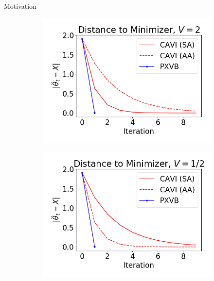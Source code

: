 \documentclass[final]{beamer}
\newlength{\onecolwid}
\begin{document}
\begin{frame}[t]
\begin{columns}[t]
\begin{column}{\onecolwid}
\begin{block}{Motivation}
\begin{figure}[h]
        \begin{subfigure}[t]{0.49\textwidth}
        \includegraphics[width=\textwidth]{normal_ex/nm_convergence1.png}
    \end{subfigure}
          \begin{subfigure}[t]{0.49\textwidth}
        \includegraphics[width=\textwidth]{normal_ex/nm_convergence2.png}
    \end{subfigure}
\end{figure}


\end{block}
\end{column}
\end{columns}
\end{frame}
\end{document}
